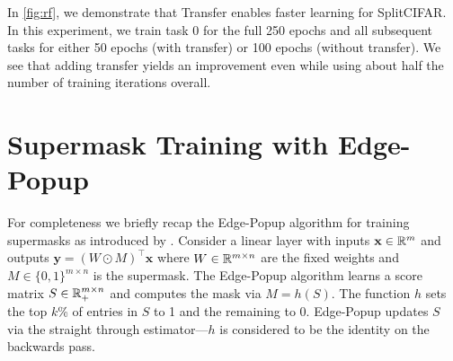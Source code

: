 \documentclass{article}
\begin{document}
In \autoref{fig:rf}, we demonstrate that Transfer enables faster learning for SplitCIFAR. In this experiment, we train task 0 for the full 250 epochs and all subsequent tasks for either 50 epochs (with transfer) or 100 epochs (without transfer). We see that adding transfer yields an improvement even while using about half the number of training iterations overall.


\section{Supermask Training with Edge-Popup} \label{sec:supermask-training}
For completeness we briefly recap the Edge-Popup algorithm for training supermasks as introduced by \cite{ramanujan2019s}. Consider a linear layer with inputs $\textbf{x} \in \mathbb{R}^m$ and outputs $\textbf{y} = (W \odot M)^\top \textbf{x}$ where $W \in \mathbb{R}^{m \times n}$ are the fixed weights and $M \in \{0, 1\}^{m \times n}$ is the supermask. The Edge-Popup algorithm learns a score matrix $S \in \mathbb{R}_+^{m \times n}$ and computes the mask via $M = h(S)$. The function $h$ sets the top $k$\% of entries in $S$ to 1 and the remaining to 0. Edge-Popup updates $S$ via the straight through estimator---$h$ is considered to be the identity on the backwards pass.
\end{document}
